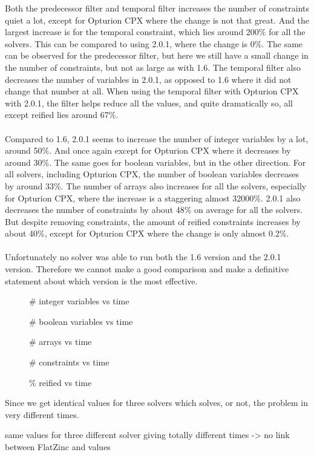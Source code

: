 Both the predecessor filter and temporal filter increases the number of constraints quiet a lot, except for Opturion CPX where the change is not that great. And the largest increase is for the temporal constraint, which lies around 200\% for all the solvers. This can be compared to using 2.0.1, where the change is 0\%. The same can be observed for the predecessor filter, but here we still have a small change in the number of constraints, but not as large as with 1.6. The temporal filter also decreases the number of variables in 2.0.1, as opposed to 1.6 where it did not change that number at all. When using the temporal filter with Opturion CPX with 2.0.1, the filter helps reduce all the values, and quite dramatically so, all except reified lies around 67\%.
\\\\
Compared to 1.6, 2.0.1 seems to increase the number of integer variables by a lot, around 50\%. And once again except for Opturion CPX where it decreases by around 30\%. The same goes for boolean variables, but in the other direction. For all solvers, including Opturion CPX, the number of boolean variables decreases by around 33\%. The number of arrays also increases for all the solvers, especially for Opturion CPX, where the increase is a staggering almost 32000\%. 2.0.1 also decreases the number of constraints by about 48\% on average for all the solvers. But despite removing constraints, the amount of reified constraints increases by about 40\%, except for Opturion CPX where the change is only almost 0.2\%.
\\\\
Unfortunately no solver was able to run both the 1.6 version and the 2.0.1 version. Therefore we cannot make a good comparison and make a definitive statement about which version is the most effective.

\begin{figure}
\centering

\caption{\# integer variables vs time}
\end{figure}

\begin{figure}
\centering

\caption{\# boolean variables vs time}
\end{figure}

\begin{figure}
\centering

\caption{\# arrays vs time}
\end{figure}

\begin{figure}
\centering

\caption{\# constraints vs time}
\end{figure}

\begin{figure}
\centering

\caption{\% reified vs time}
\end{figure}

Since we get identical values for three solvers which solves, or not, the problem in very different times. 

same values for three different solver giving totally different times -> no link between FlatZinc and values
